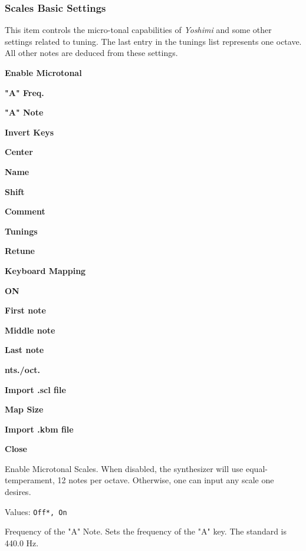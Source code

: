 \subsubsection{Scales Basic Settings}
\label{subsubsec:scales_basic_settings}

   This item controls the micro-tonal capabilities of \textsl{Yoshimi} and
   some other settings related to tuning.
   The last entry in the tunings list represents one octave.
   All other notes are deduced from these settings.

   \begin{enumber}
      \item \textbf{Enable Microtonal}
      \item \textbf{"A" Freq.}
      \item \textbf{"A" Note}
      \item \textbf{Invert Keys}
      \item \textbf{Center}
      \item \textbf{Name}
      \item \textbf{Shift}
      \item \textbf{Comment}
      \item \textbf{Tunings}
      \item \textbf{Retune}
      \item \textbf{Keyboard Mapping}
      \item \textbf{ON}
      \item \textbf{First note}
      \item \textbf{Middle note}
      \item \textbf{Last note}
      \item \textbf{nts./oct.}
      \item \textbf{Import .scl file}
      \item \textbf{Map Size}
      \item \textbf{Import .kbm file}
      \item \textbf{Close}
   \end{enumber}

   \setcounter{ItemCounter}{0}      %

   Enable Microtonal Scales.
   When disabled, the synthesizer will use equal-temperament, 12 notes per
   octave.  Otherwise, one can input any scale one desires.

   Values: \texttt{Off*, On}

   Frequency of the "A" Note.
   Sets the frequency of the "A" key. The standard is 440.0 Hz.

